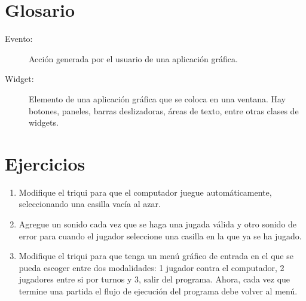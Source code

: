 \section{Glosario}
\begin{description}
\item [{Evento:}] Acción generada por el usuario de una aplicación gráfica.
\item [{Widget:}] Elemento de una aplicación gráfica que se coloca en una
ventana. Hay botones, paneles, barras deslizadoras, áreas de texto,
entre otras clases de widgets.
\end{description}

\section{Ejercicios}
\begin{enumerate}
\item Modifique el triqui para que el computador juegue automáticamente,
seleccionando una casilla vacía al azar.
\item Agregue un sonido cada vez que se haga una jugada válida y otro sonido
de error para cuando el jugador seleccione una casilla en la que ya
se ha jugado.
\item Modifique el triqui para que tenga un menú gráfico de entrada en el
que se pueda escoger entre dos modalidades: 1 jugador contra el computador,
2 jugadores entre si por turnos y 3, salir del programa. Ahora, cada
vez que termine una partida el flujo de ejecución del programa debe
volver al menú.
\end{enumerate}

